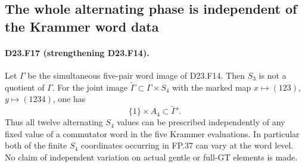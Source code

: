 \subsection{The whole alternating phase is independent of the Krammer word data}

\paragraph{D23.F17 (strengthening D23.F14).}
Let $\Gamma$ be the simultaneous five-pair word image
of D23.F14. Then $S_3$ is not a quotient of $\Gamma$.
For the joint image $\widetilde\Gamma\subset
\Gamma\times S_4$ with the marked map
$x\mapsto(123)$, $y\mapsto(1234)$, one has
\[
 \{1\}\times A_4\subset\widetilde\Gamma'.
\tag{D23.F17.1}
\]
Thus all twelve alternating $S_4$ values can be
prescribed independently of any fixed value of a
commutator word in the five Krammer evaluations.
In particular both of the finite $S_4$ coordinates
occurring in FP.37 can vary at the word level.
No claim of independent variation on actual gentle
or full-GT elements is made.

